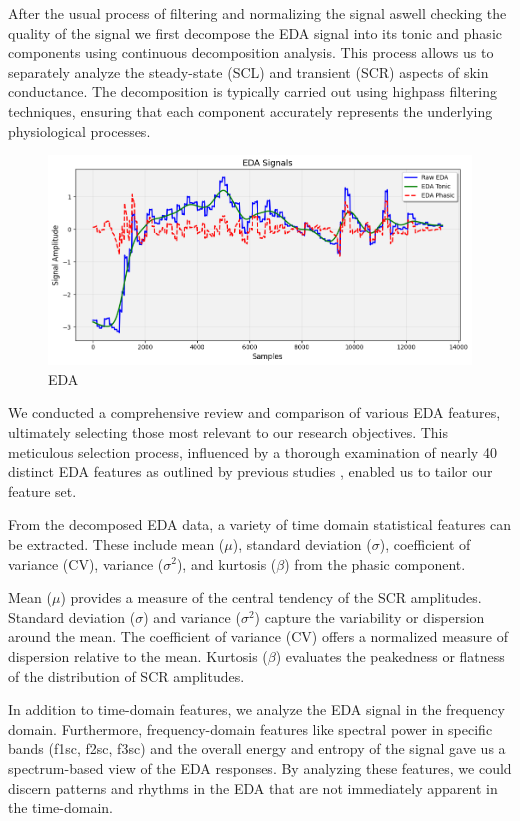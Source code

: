 After the usual process of filtering and normalizing the signal aswell checking the quality of the signal we first decompose the EDA signal into its tonic and phasic components using continuous decomposition analysis. This process allows us to separately analyze the steady-state (SCL) and transient (SCR) aspects of skin conductance.
The decomposition is typically carried out using highpass filtering techniques, ensuring that each component accurately represents the underlying physiological processes.
\begin{figure}[hb]
	\centering
	\includegraphics[width=\columnwidth]{images/eda.png}
	\caption{EDA}
	\label{fig:eda sig}
\end{figure}

We conducted a comprehensive review and comparison of various EDA features, ultimately selecting those most relevant to our research objectives. This meticulous selection process, influenced by a thorough examination of nearly 40 distinct EDA features as outlined by previous studies \textcite{EDAFeatures}, enabled us to tailor our feature set.

From the decomposed EDA data, a variety of time domain statistical features can be extracted. These include mean ($\mu$), standard deviation ($\sigma$), coefficient of variance (CV), variance ($\sigma^2$), and kurtosis ($\beta$) from the phasic component.

Mean ($\mu$) provides a measure of the central tendency of the SCR amplitudes.
Standard deviation ($\sigma$) and variance ($\sigma^2$) capture the variability or dispersion around the mean.
The coefficient of variance (CV) offers a normalized measure of dispersion relative to the mean.
Kurtosis ($\beta$) evaluates the peakedness or flatness of the distribution of SCR amplitudes.

In addition to time-domain features, we analyze the EDA signal in the frequency domain. Furthermore, frequency-domain features like spectral power in specific bands (f1sc, f2sc, f3sc) and the overall energy and entropy of the signal gave us a spectrum-based view of the EDA responses. By analyzing these features, we could discern patterns and rhythms in the EDA that are not immediately apparent in the time-domain.


